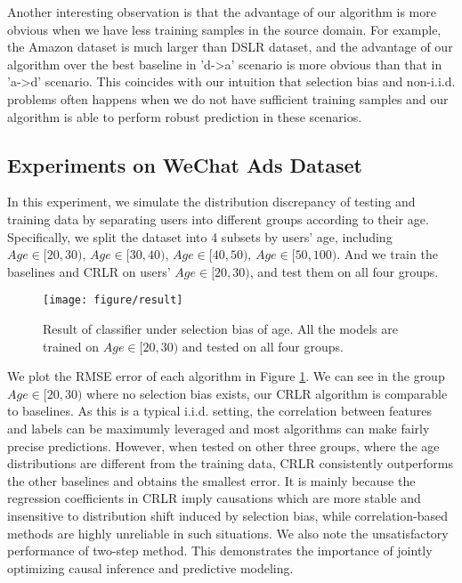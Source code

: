 \documentclass[sigconf]{acmart}
\begin{document}
Another interesting observation is that the advantage of our algorithm is more obvious when we have less training samples in the source domain. 
For example, the Amazon dataset is much larger than DSLR dataset, and the advantage of our algorithm over the best baseline in 'd->a' scenario is more obvious than that in 'a->d' scenario. 
This coincides with our intuition that selection bias and non-i.i.d. problems often happens when we do not have sufficient training samples and our algorithm is able to perform robust prediction in these scenarios.

\subsection{Experiments on WeChat Ads Dataset}
In this experiment, we simulate the distribution discrepancy of testing and training data by separating users into different groups according to their age.
Specifically, we split the dataset into 4 subsets by users’ age, including $Age \in [20, 30)$, $Age \in [30, 40)$, $Age \in [40, 50)$, $Age \in [50, 100)$.
And we train the baselines and CRLR on users' $Age \in [20, 30)$, and test them on all four groups.

\begin{figure}[h]
\texttt{[image: figure/result]}
\caption{Result of classifier under selection bias of age. All the models are trained on $Age \in [20, 30)$ and tested on all four groups.}
\label{fig:age_bias}
\end{figure}

We plot the RMSE error of each algorithm in Figure \ref{fig:age_bias}.
We can see in the group $Age \in [20,30)$ where no selection bias exists, our CRLR algorithm is comparable to baselines.
As this is a typical i.i.d. setting, the correlation between features and labels can be maximumly leveraged and most algorithms can make fairly precise predictions.
However, when tested on other three groups, where the age distributions are different from the training data, CRLR consistently outperforms the other baselines and obtains the smallest error.
It is mainly because the regression coefficients in CRLR imply causations which are more stable and insensitive to distribution shift induced by selection bias, while correlation-based methods are highly unreliable in such situations.
We also note the unsatisfactory performance of two-step method. This demonstrates the importance of jointly optimizing causal inference and predictive modeling.
\end{document}

